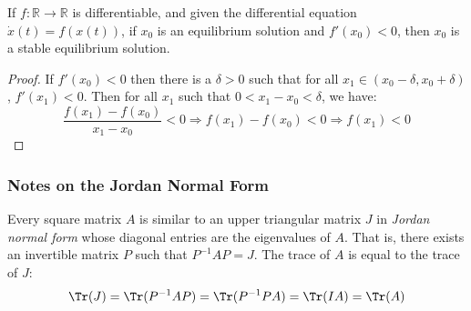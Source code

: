                 \begin{theorem}
                    If $f:\mathbb{R}\rightarrow\mathbb{R}$ is differentiable,
                    and given the differential equation
                    $\dot{x}(t)=f(x(t))$, if $x_{0}$ is an equilibrium
                    solution and $f'(x_{0})<0$, then $x_{0}$ is
                    a stable equilibrium solution.
                \end{theorem}
                \begin{proof}
                    If $f'(x_{0})<0$ then there is a $\delta>0$ such
                    that for all $x_{1}\in(x_{0}-\delta,x_{0}+\delta)$,
                    $f'(x_{1})<0$. Then for all $x_{1}$ such that
                    $0<x_{1}-x_{0}<\delta$, we have:
                    \begin{equation*}
                        \frac{f(x_{1})-f(x_{0})}{x_{1}-x_{0}}<0
                        \Rightarrow
                        f(x_{1})-f(x_{0})<0
                        \Rightarrow
                        f(x_{1})<0
                    \end{equation*}
                    
                \end{proof}
        \subsubsection{Notes on the Jordan Normal Form}
            Every square matrix $A$ is similar to an upper
            triangular matrix $J$ in
            \textit{Jordan normal form} whose diagonal entries
            are the eigenvalues of $A$. That is, there exists
            an invertible matrix $P$ such that $P^{-1}AP=J$.
            The trace of $A$ is equal to the trace of $J$:
            \begin{equation*}
                \Tr(J)
                =\Tr(P^{-1}AP)
                =\Tr(P^{-1}PA)
                =\Tr(IA)=\Tr(A)
            \end{equation*}
